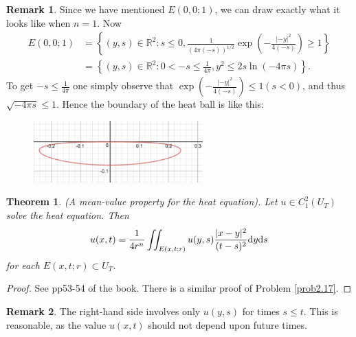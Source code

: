 \documentclass[hyperref,UTF8,12pt]{article}
\numberwithin{equation}{subsection}
\theoremstyle{plain}
\newtheorem{theorem}{Theorem}
\theoremstyle{definition}
\newtheorem{remark}{Remark}
\numberwithin{theorem}{section}
\numberwithin{lemma}{section}
\numberwithin{proposition}{section}
\numberwithin{remark}{section}
\numberwithin{corollary}{section}
\numberwithin{definition}{section}
\numberwithin{problem}{section}
\numberwithin{example}{section}
\def\dif{\textup{d}}
\newcommand{\mr}{\mathbb{R}}
\renewcommand{\leq}{\leqslant}
\renewcommand{\geq}{\geqslant}
\begin{document}
\begin{remark}
Since we have mentioned $E(0,0;1)$, we can draw exactly what it looks like when $n=1$. Now\[
\begin{aligned}
	E(0,0;1)&=\left\{(y,s)\in\mr^2:s\leq0,\frac{1}{(4\pi(-s))^{1/2}}\exp \left(-\frac{|-y|^2}{4(-s)}\right)\geq1\right\} \\
	&=\left\{(y,s)\in\mr^2:0<-s\leq\frac{1}{4\pi},y^2\leq2s\ln(-4\pi s)\right\}.
\end{aligned}\]To get $-s\leq\frac{1}{4\pi}$ one simply observe that $\exp\left(-\frac{|-y|^2}{4(-s)}\right)\leq1(s<0)$, and thus $\sqrt{-4\pi s}\leq1$. Hence the boundary of the heat ball is like this:
\begin{figure}[h]
	\centering
	\includegraphics[width=0.58\textwidth]{E(0,0;1).png}
\end{figure}
\end{remark}
\begin{theorem}\label{thm2.205}
(A mean-value property for the heat equation). Let $u\in C_1^2(U_T)$ solve the heat equation. Then\[u(x,t)=\frac{1}{4r^n}\iint_{E(x,t;r)}u(y,s)\frac{|x-y|^2}{(t-s)^2}\dif y\dif s\]for each $E(x,t;r)\subset U_T$.
\end{theorem}
\begin{proof}
See pp53-54 of the book. There is a similar proof of Problem \ref{prob2.17}.
\end{proof}
\begin{remark}
The right-hand side involves only $u(y,s)$ for times $s\leq t$. This is reasonable, as the value $u(x,t)$ should not depend upon future times.
\end{remark}
\end{document}
